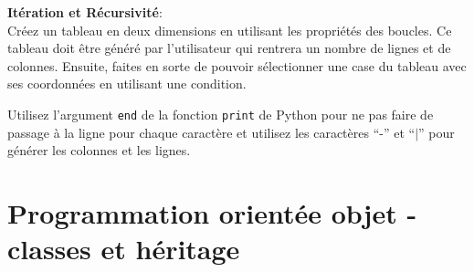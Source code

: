 \begin{Exercice}[15 minutes] \textbf{Itération et Récursivité}:\\
    Créez un tableau en deux dimensions en utilisant les propriétés des boucles. Ce tableau doit être généré par l’utilisateur qui rentrera un nombre de lignes et de colonnes. 
    Ensuite, faites en sorte de pouvoir sélectionner une case du tableau avec ses coordonnées en utilisant une condition. 
    \begin{conseil}
        Utilisez l'argument \lstinline{end} de la fonction \lstinline{print} de Python pour ne pas faire de passage à la ligne pour chaque caractère et utilisez les caractères “-” et “$|$” pour générer les colonnes et les lignes.
    \end{conseil}

    \begin{solution}
        
    \end{solution}
\end{Exercice}

\section{Programmation orientée objet - classes et héritage}

